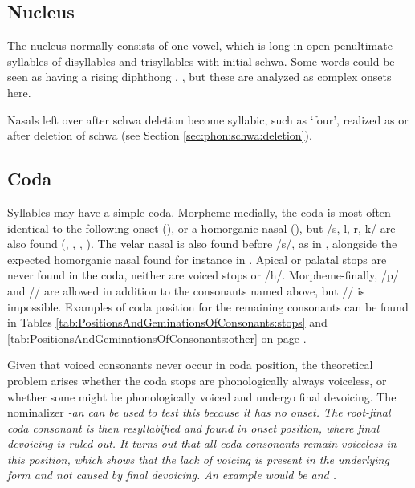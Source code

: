 \subsection{Nucleus}\label{sec:phon:Nucleus}
The nucleus normally consists of one vowel, which is long in open penultimate syllables of disyllables and trisyllables with initial schwa. Some words could be seen as having a rising diphthong , , but these are analyzed as complex onsets here.

Nasals left over after schwa deletion become syllabic, such as `four', realized as  or  after deletion of schwa (see Section \ref{sec:phon:schwa:deletion}).

\subsection{Coda}\label{sec:phon:Coda}
Syllables may have a simple coda. Morpheme-medially, the coda is most often identical to the following onset (), or a homorganic nasal (), but /s, l, r, k/ are also found (, ,  , ). The velar nasal  is also found before /s/, as in , alongside the expected homorganic nasal found for instance in . Apical or palatal stops are never found in the coda, neither are voiced stops or /h/. Morpheme-finally, /p/ and /\dentt{}/ are allowed in addition to the consonants named above, but /\ny{}/ is impossible. Examples of coda position for the remaining consonants can be found in Tables \ref{tab:PositionsAndGeminationsOfConsonants:stops} and \ref{tab:PositionsAndGeminationsOfConsonants:other} on page \pageref{tab:PositionsAndGeminationsOfConsonants:stops}.

Given that voiced consonants never occur in coda position, the theoretical problem arises whether the coda stops are phonologically always voiceless, or whether some might be phonologically voiced and undergo final devoicing. The nominalizer \em -an \em can be used to test this because it has no onset. The root-final coda consonant is then resyllabified and found in onset position, where final devoicing is ruled out. It turns out that all coda consonants remain voiceless in this position, which shows that the lack of voicing is present in the underlying form and not caused by final devoicing. An example would be  and .




